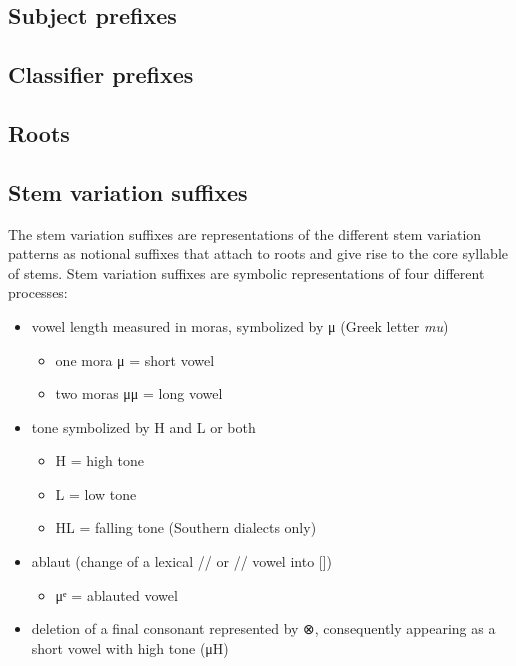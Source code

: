 \subsection{Subject prefixes}\label{sec:inventory-subject}

\subsection{Classifier prefixes}\label{sec:inventory-classifier}

\subsection{Roots}\label{sec:inventory-root}

\subsection{Stem variation suffixes}\label{sec:inventory-stemvar}

The stem variation suffixes are representations of the different stem variation patterns
as notional suffixes that attach to roots and give rise to the core syllable of stems.
Stem variation suffixes are symbolic representations of four different processes:

\begin{itemize}
\item	vowel length measured in moras, symbolized by μ (Greek letter \textit{mu})
	\begin{itemize}
	\item	one mora μ = short vowel
	\item	two moras μμ = long vowel
	\end{itemize}
\item	tone symbolized by H and L or both
	\begin{itemize}
	\item	H = high tone
	\item	L = low tone
	\item	HL = falling tone (Southern dialects only)
	\end{itemize}
\item	ablaut (change of a lexical // or // vowel into [])
	\begin{itemize}
	\item	μᵉ = ablauted vowel
	\end{itemize}
\item	deletion of a final consonant represented by ⊗,
	consequently appearing as a short vowel with high tone (μH)
\end{itemize}

